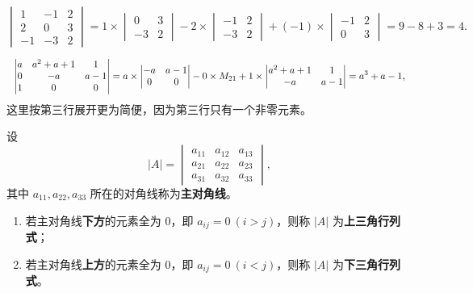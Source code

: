 \begin{example}
\[
\begin{vmatrix}
1 & -1 & 2\\
2 & 0 & 3\\
-1 & -3 & 2
\end{vmatrix}
= 1\times\begin{vmatrix} 0 & 3\\ -3 & 2\end{vmatrix}
- 2\times\begin{vmatrix} -1 & 2\\ -3 & 2\end{vmatrix}
+(-1)\times\begin{vmatrix} -1 & 2\\ 0 & 3\end{vmatrix}
= 9-8+3 = 4.
\]
\end{example}

\begin{example}
\[
\resizebox{\linewidth}{!}{$\displaystyle
\begin{vmatrix}
a & a^2+a+1 & 1\\
0 & -a & a-1\\
1 & 0 & 0
\end{vmatrix}
= a\times\begin{vmatrix} -a & a-1\\ 0 & 0\end{vmatrix}
- 0\times M_{21}
+ 1\times\begin{vmatrix} a^2+a+1 & 1\\ -a & a-1\end{vmatrix}
= a^3+a-1$},
\]
这里按第三行展开更为简便，因为第三行只有一个非零元素。
\end{example}

\begin{definition}[上、下三角行列式]
设
\[
|A|=\begin{vmatrix}
a_{11} & a_{12} & a_{13}\\
a_{21} & a_{22} & a_{23}\\
a_{31} & a_{32} & a_{33}
\end{vmatrix},
\]
其中 $a_{11},a_{22},a_{33}$ 所在的对角线称为\textbf{主对角线}。
\begin{enumerate}[label=\textbullet,leftmargin=2.2em,itemsep=0.2em]
\item 若主对角线\textbf{下方}的元素全为 $0$，即 $a_{ij}=0\ (i>j)$，则称 $|A|$ 为\textbf{上三角行列式}；
\item 若主对角线\textbf{上方}的元素全为 $0$，即 $a_{ij}=0\ (i<j)$，则称 $|A|$ 为\textbf{下三角行列式}。
\end{enumerate}
\end{definition}

